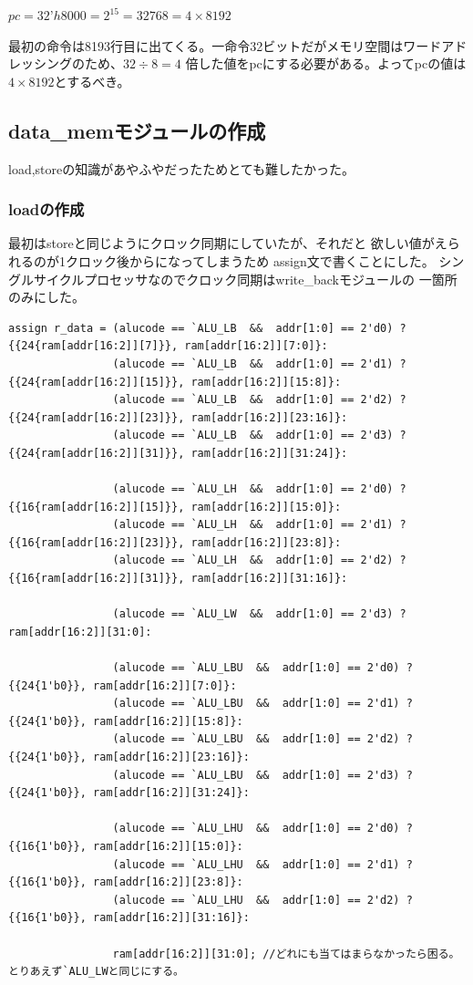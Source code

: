 \documentclass[a4paper,11pt]{jsarticle}
\begin{document}
$pc = 32’h8000 = 2^{15} = 32768 = 4 \times 8192$

最初の命令は8193行目に出てくる。一命令32ビットだがメモリ空間はワードアドレッシングのため、$32\div8=4$
倍した値をpcにする必要がある。よってpcの値は$4 \times 8192$とするべき。

\subsection{data\_memモジュールの作成}
load,storeの知識があやふやだったためとても難したかった。
\subsubsection{loadの作成}
最初はstoreと同じようにクロック同期にしていたが、それだと
欲しい値がえられるのが1クロック後からになってしまうため
assign文で書くことにした。
シングルサイクルプロセッサなのでクロック同期はwrite\_backモジュールの
一箇所のみにした。
\begin{lstlisting}[style={verilog-style}]
assign r_data = (alucode == `ALU_LB  &&  addr[1:0] == 2'd0) ? {{24{ram[addr[16:2]][7]}}, ram[addr[16:2]][7:0]}:
                (alucode == `ALU_LB  &&  addr[1:0] == 2'd1) ? {{24{ram[addr[16:2]][15]}}, ram[addr[16:2]][15:8]}:
                (alucode == `ALU_LB  &&  addr[1:0] == 2'd2) ? {{24{ram[addr[16:2]][23]}}, ram[addr[16:2]][23:16]}:
                (alucode == `ALU_LB  &&  addr[1:0] == 2'd3) ? {{24{ram[addr[16:2]][31]}}, ram[addr[16:2]][31:24]}:

                (alucode == `ALU_LH  &&  addr[1:0] == 2'd0) ? {{16{ram[addr[16:2]][15]}}, ram[addr[16:2]][15:0]}:
                (alucode == `ALU_LH  &&  addr[1:0] == 2'd1) ? {{16{ram[addr[16:2]][23]}}, ram[addr[16:2]][23:8]}:
                (alucode == `ALU_LH  &&  addr[1:0] == 2'd2) ? {{16{ram[addr[16:2]][31]}}, ram[addr[16:2]][31:16]}:

                (alucode == `ALU_LW  &&  addr[1:0] == 2'd3) ? ram[addr[16:2]][31:0]:

                (alucode == `ALU_LBU  &&  addr[1:0] == 2'd0) ? {{24{1'b0}}, ram[addr[16:2]][7:0]}:
                (alucode == `ALU_LBU  &&  addr[1:0] == 2'd1) ? {{24{1'b0}}, ram[addr[16:2]][15:8]}:
                (alucode == `ALU_LBU  &&  addr[1:0] == 2'd2) ? {{24{1'b0}}, ram[addr[16:2]][23:16]}:
                (alucode == `ALU_LBU  &&  addr[1:0] == 2'd3) ? {{24{1'b0}}, ram[addr[16:2]][31:24]}:

                (alucode == `ALU_LHU  &&  addr[1:0] == 2'd0) ? {{16{1'b0}}, ram[addr[16:2]][15:0]}:
                (alucode == `ALU_LHU  &&  addr[1:0] == 2'd1) ? {{16{1'b0}}, ram[addr[16:2]][23:8]}:
                (alucode == `ALU_LHU  &&  addr[1:0] == 2'd2) ? {{16{1'b0}}, ram[addr[16:2]][31:16]}:

                ram[addr[16:2]][31:0]; //どれにも当てはまらなかったら困る。とりあえず`ALU_LWと同じにする。
\end{lstlisting}
\end{document}
